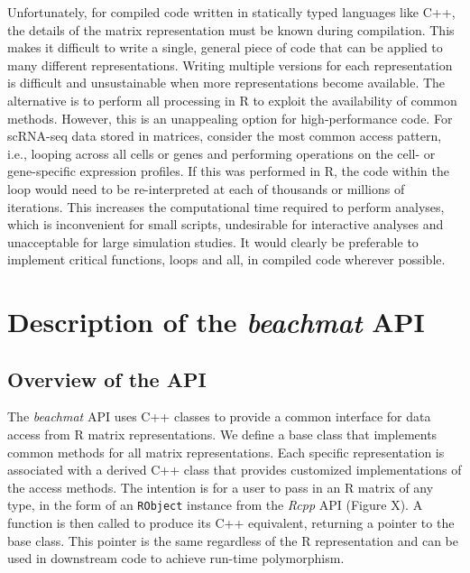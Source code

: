 \documentclass[10pt,letterpaper]{article}
\newcommand{\beachmat}{\textit{beachmat}}
\newcommand{\code}[1]{\texttt{#1}}
\begin{document}
Unfortunately, for compiled code written in statically typed languages like C++, the details of the matrix representation must be known during compilation.
This makes it difficult to write a single, general piece of code that can be applied to many different representations.
Writing multiple versions for each representation is difficult and unsustainable when more representations become available.
The alternative is to perform all processing in R to exploit the availability of common methods.
However, this is an unappealing option for high-performance code.
For scRNA-seq data stored in matrices, consider the most common access pattern, i.e., looping across all cells or genes and performing operations on the cell- or gene-specific expression profiles.
If this was performed in R, the code within the loop would need to be re-interpreted at each of thousands or millions of iterations.
This increases the computational time required to perform analyses, which is inconvenient for small scripts, undesirable for interactive analyses and unacceptable for large simulation studies.
It would clearly be preferable to implement critical functions, loops and all, in compiled code wherever possible.


\section*{Description of the \beachmat{} API}

\subsection*{Overview of the API}
The \beachmat{} API uses C++ classes to provide a common interface for data access from R matrix representations.
We define a base class that implements common methods for all matrix representations.
Each specific representation is associated with a derived C++ class that provides customized implementations of the access methods.
The intention is for a user to pass in an R matrix of any type, in the form of an \code{RObject} instance from the \textit{Rcpp} API (Figure X).
A function is then called to produce its C++ equivalent, returning a pointer to the base class.
This pointer is the same regardless of the R representation and can be used in downstream code to achieve run-time polymorphism.
\end{document}
